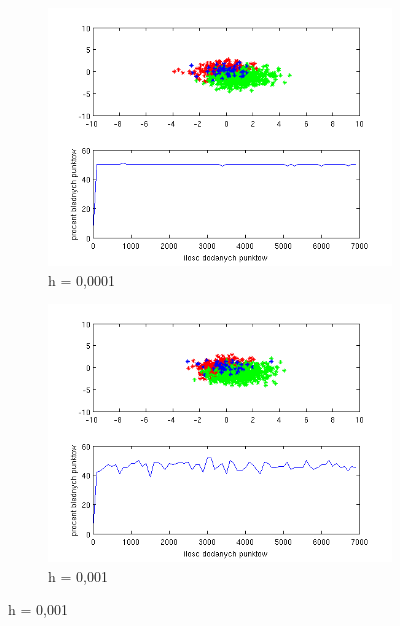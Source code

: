 \documentclass[10pt,a4paper]{article}
\begin{document}
\begin{figure}[h]
  \begin{subfigure}[b]{0.5\textwidth}
    \includegraphics[width=\textwidth]{test_h0_0001.png}
    \caption{h = 0,0001}
  \end{subfigure}
  \hfill
  \begin{subfigure}[b]{0.5\textwidth}
    \includegraphics[width=\textwidth]{test_h0_001.png}
    \caption{h = 0,001}
  \end{subfigure}


\end{figure}
\end{document}

